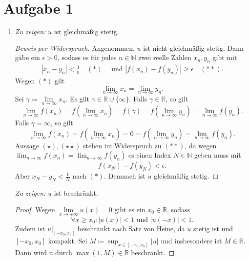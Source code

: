 \documentclass[a4paper]{article}
\theoremstyle{plain}
\begin{document}
\section*{Aufgabe 1}
\begin{enumerate}[label=(\roman*)]
	\item \textit{Zu zeigen:} $u$ ist gleichmäßig stetig.
	\begin{proof}[Beweis per Widerspruch]
		Angenommen, $u$ ist nicht gleichmäßig stetig. Dann gäbe ein $\epsilon > 0$, sodass es für jedes $n \in \mathbb N$ zwei reelle Zahlen $x_n,y_n$ gibt mit
		\begin{align*}
			|x_n-y_n| < \frac{1}{n} \quad (*) \quad \text{ und } |f(x_n)-f(y_n)| \geq \epsilon \quad(**).
		\end{align*}
		Wegen $(*)$ gilt $$\lim\limits_{n \to \infty}x_n =  \lim\limits_{n \to \infty}y_n.$$ Sei $\gamma \coloneqq \lim\limits_{n \to \infty}x_n$. Es gilt $\gamma \in \mathbb R \cup \{ \infty \}$. Falls $\gamma \in \mathbb R$, so gilt
		\[
			\lim_{n \to \infty}f(x_n) = f(\lim_{n \to \infty}x_n) = f(\gamma) = f(\lim_{n \to \infty}y_n) = \lim_{n \to \infty}f(y_n) \tag{$\star$}.
		\]
		Falls $\gamma = \infty$, so gilt
		\[
			\lim_{n \to \infty}f(x_n) = f(\lim_{n \to \infty}x_n) = 0 = f(\lim_{n \to \infty}y_n) = \lim_{n \to \infty}f(y_n) \tag{$\star \star$}.
		\]
		Aussage $(\star), (\star \star)$ stehen im Widerspruch zu $(**)$, da wegen $\lim_{n \to \infty}f(x_n) = \lim_{n \to \infty}f(y_n)$ es einen Index $N \in \mathbb N$ geben muss mit
		\[
			f(x_N)-f(y_N) < \epsilon.
		\] 
		Aber $x_N - y_N < \frac{1}{N}$ nach $(*)$. Demnach ist $u$ gleichmäßig stetig.
	\end{proof}
		
		\textit{Zu zeigen:} $u$ ist beschränkt.
		\begin{proof}
			Wegen $\lim\limits_{x\to \pm \infty} u(x) = 0$ gibt es ein $x_0 \in \mathbb R$, sodass 
			\[
				\forall x \geq x_0: |u(x)| < 1 \text{ und } |u(-x)| < 1.
			\]
			Zudem ist $u\vert_{[-x_0,x_0]}$ beschränkt nach Satz von Heine, da $u$ stetig ist und $[-x_0,x_0]$ kompakt. Sei $M \coloneqq \sup_{x \in [-x_0,x_0]}|u|$ und insbesondere ist $M \in \mathbb R$. Dann wird u durch $\max(1, M) \in \mathbb R$ beschränkt.
		\end{proof}
	

\end{enumerate}
\end{document}
